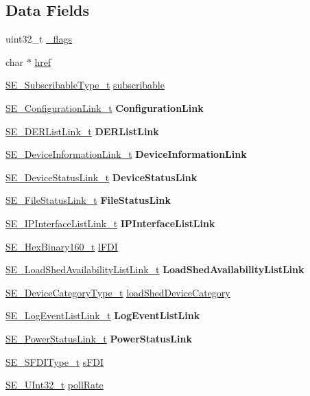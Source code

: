 \subsection*{Data Fields}
\begin{DoxyCompactItemize}
\item 
uint32\+\_\+t \hyperlink{group__SelfDevice_ga27f85d9e504787c2216b4e4b563acd5a}{\+\_\+flags}
\item 
char $\ast$ \hyperlink{group__SelfDevice_ga2aea57d2afcdf455280b2f24ea8ccdd4}{href}
\item 
\hyperlink{group__SubscribableType_ga5c41f553d369710ed34619266bf2551e}{S\+E\+\_\+\+Subscribable\+Type\+\_\+t} \hyperlink{group__SelfDevice_gaa48517dd0693a35578006ff2ab117c35}{subscribable}
\item 
\hyperlink{structSE__ConfigurationLink__t}{S\+E\+\_\+\+Configuration\+Link\+\_\+t} {\bfseries Configuration\+Link}
\item 
\hyperlink{structSE__DERListLink__t}{S\+E\+\_\+\+D\+E\+R\+List\+Link\+\_\+t} {\bfseries D\+E\+R\+List\+Link}
\item 
\hyperlink{structSE__DeviceInformationLink__t}{S\+E\+\_\+\+Device\+Information\+Link\+\_\+t} {\bfseries Device\+Information\+Link}
\item 
\hyperlink{structSE__DeviceStatusLink__t}{S\+E\+\_\+\+Device\+Status\+Link\+\_\+t} {\bfseries Device\+Status\+Link}
\item 
\hyperlink{structSE__FileStatusLink__t}{S\+E\+\_\+\+File\+Status\+Link\+\_\+t} {\bfseries File\+Status\+Link}
\item 
\hyperlink{structSE__IPInterfaceListLink__t}{S\+E\+\_\+\+I\+P\+Interface\+List\+Link\+\_\+t} {\bfseries I\+P\+Interface\+List\+Link}
\item 
\hyperlink{group__HexBinary160_ga92b92aa55555bdb75f3a59060f2c1632}{S\+E\+\_\+\+Hex\+Binary160\+\_\+t} \hyperlink{group__SelfDevice_gadbf029568d8491054c76882da4576499}{l\+F\+DI}
\item 
\hyperlink{structSE__LoadShedAvailabilityListLink__t}{S\+E\+\_\+\+Load\+Shed\+Availability\+List\+Link\+\_\+t} {\bfseries Load\+Shed\+Availability\+List\+Link}
\item 
\hyperlink{group__DeviceCategoryType_gafc136ae19a3dd5b2fd2265d848ddeb2f}{S\+E\+\_\+\+Device\+Category\+Type\+\_\+t} \hyperlink{group__SelfDevice_ga8c97bdb8ed0564bd06baf603e87f586c}{load\+Shed\+Device\+Category}
\item 
\hyperlink{structSE__LogEventListLink__t}{S\+E\+\_\+\+Log\+Event\+List\+Link\+\_\+t} {\bfseries Log\+Event\+List\+Link}
\item 
\hyperlink{structSE__PowerStatusLink__t}{S\+E\+\_\+\+Power\+Status\+Link\+\_\+t} {\bfseries Power\+Status\+Link}
\item 
\hyperlink{group__SFDIType_ga08ad209b3cfce51cbdc450d1d35a1045}{S\+E\+\_\+\+S\+F\+D\+I\+Type\+\_\+t} \hyperlink{group__SelfDevice_ga751d47704f76026ac661f82420bb9248}{s\+F\+DI}
\item 
\hyperlink{group__UInt32_ga70bd4ecda3c0c85d20779d685a270cdb}{S\+E\+\_\+\+U\+Int32\+\_\+t} \hyperlink{group__SelfDevice_ga3a1b571c04f84d22a2fd7b3bfe32e487}{poll\+Rate}
\end{DoxyCompactItemize}


